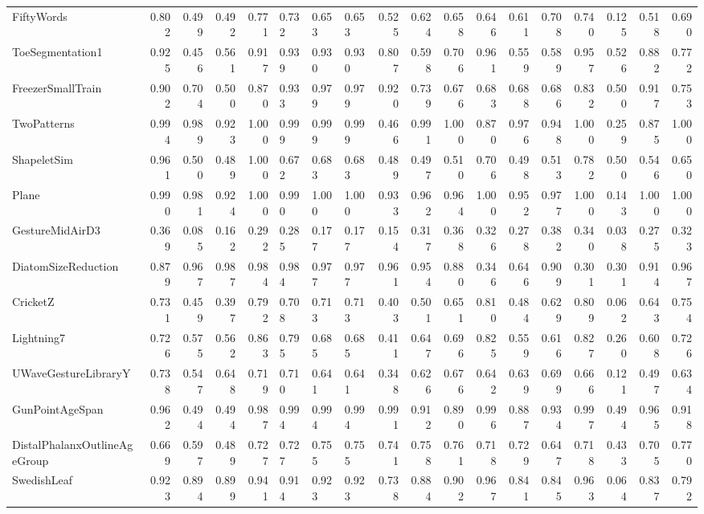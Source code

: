 \begin{tabular}{lrrrrlllrrrrrrrrrr}
FiftyWords & 0.802 & 0.499 & 0.492 & 0.771 & 0.732 & 0.653 & 0.653 & 0.525 & 0.624 & 0.658 & 0.646 & 0.611 & 0.708 & 0.740 & 0.125 & 0.518 & 0.690 \\
ToeSegmentation1 & 0.925 & 0.456 & 0.561 & 0.917 & 0.939 & 0.930 & 0.930 & 0.807 & 0.598 & 0.706 & 0.961 & 0.559 & 0.589 & 0.957 & 0.526 & 0.882 & 0.772 \\
FreezerSmallTrain & 0.902 & 0.704 & 0.500 & 0.870 & 0.933 & 0.979 & 0.979 & 0.920 & 0.739 & 0.676 & 0.683 & 0.688 & 0.686 & 0.832 & 0.500 & 0.917 & 0.753 \\
TwoPatterns & 0.994 & 0.989 & 0.923 & 1.000 & 0.999 & 0.999 & 0.999 & 0.466 & 0.991 & 1.000 & 0.870 & 0.976 & 0.948 & 1.000 & 0.259 & 0.875 & 1.000 \\
ShapeletSim & 0.961 & 0.500 & 0.489 & 1.000 & 0.672 & 0.683 & 0.683 & 0.489 & 0.497 & 0.510 & 0.706 & 0.498 & 0.513 & 0.782 & 0.500 & 0.546 & 0.650 \\
Plane & 0.990 & 0.981 & 0.924 & 1.000 & 0.990 & 1.000 & 1.000 & 0.933 & 0.962 & 0.964 & 1.000 & 0.952 & 0.977 & 1.000 & 0.143 & 1.000 & 1.000 \\
GestureMidAirD3 & 0.369 & 0.085 & 0.162 & 0.292 & 0.285 & 0.177 & 0.177 & 0.154 & 0.317 & 0.368 & 0.326 & 0.278 & 0.382 & 0.340 & 0.038 & 0.275 & 0.323 \\
DiatomSizeReduction & 0.879 & 0.967 & 0.987 & 0.984 & 0.984 & 0.977 & 0.977 & 0.961 & 0.954 & 0.880 & 0.346 & 0.646 & 0.909 & 0.301 & 0.301 & 0.914 & 0.967 \\
CricketZ & 0.731 & 0.459 & 0.397 & 0.792 & 0.708 & 0.713 & 0.713 & 0.403 & 0.501 & 0.651 & 0.810 & 0.484 & 0.629 & 0.809 & 0.062 & 0.643 & 0.754 \\
Lightning7 & 0.726 & 0.575 & 0.562 & 0.863 & 0.795 & 0.685 & 0.685 & 0.411 & 0.647 & 0.696 & 0.825 & 0.559 & 0.616 & 0.827 & 0.260 & 0.608 & 0.726 \\
UWaveGestureLibraryY & 0.738 & 0.547 & 0.648 & 0.719 & 0.710 & 0.641 & 0.641 & 0.348 & 0.626 & 0.676 & 0.642 & 0.639 & 0.699 & 0.666 & 0.121 & 0.497 & 0.634 \\
GunPointAgeSpan & 0.962 & 0.494 & 0.494 & 0.987 & 0.994 & 0.994 & 0.994 & 0.991 & 0.912 & 0.890 & 0.996 & 0.887 & 0.934 & 0.997 & 0.494 & 0.965 & 0.918 \\
DistalPhalanxOutlineAgeGroup & 0.669 & 0.597 & 0.489 & 0.727 & 0.727 & 0.755 & 0.755 & 0.741 & 0.758 & 0.761 & 0.718 & 0.729 & 0.647 & 0.718 & 0.433 & 0.705 & 0.770 \\
SwedishLeaf & 0.923 & 0.894 & 0.899 & 0.941 & 0.914 & 0.923 & 0.923 & 0.738 & 0.884 & 0.902 & 0.967 & 0.841 & 0.845 & 0.963 & 0.064 & 0.837 & 0.792 \\

\end{tabular}
